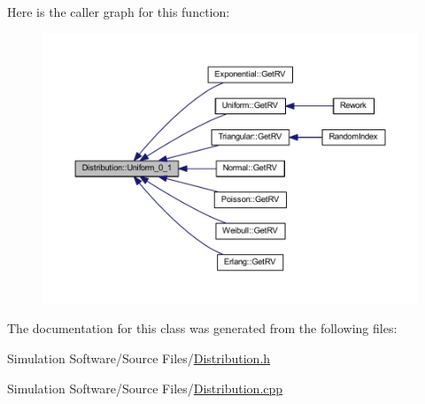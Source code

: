Here is the caller graph for this function\+:
\nopagebreak
\begin{figure}[H]
\begin{center}
\leavevmode
\includegraphics[width=350pt]{class_distribution_a33965648e4c6d3bbc93c61ccd3897c98_icgraph}
\end{center}
\end{figure}


The documentation for this class was generated from the following files\+:\begin{DoxyCompactItemize}
\item 
Simulation Software/\+Source Files/\hyperlink{_distribution_8h}{Distribution.\+h}\item 
Simulation Software/\+Source Files/\hyperlink{_distribution_8cpp}{Distribution.\+cpp}\end{DoxyCompactItemize}
